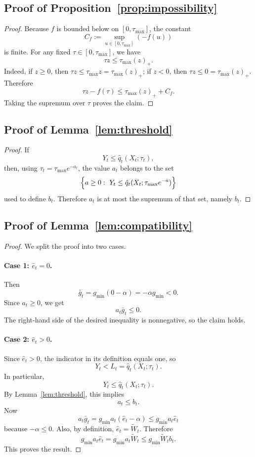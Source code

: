 \documentclass[11pt]{article}
\newcommand{\1}{\mathbf{1}}
\begin{document}
\subsection{Proof of Proposition~\ref{prop:impossibility}}
\label{app:proof-impossibility}

\begin{proof}
Because $f$ is bounded below on $[0,\tau_{\max}]$, the constant
\[
C_f:=\sup_{u\in[0,\tau_{\max}]}(-f(u))
\]
is finite. For any fixed \(\tau\in[0,\tau_{\max}]\), we have
\[
\tau z\le \tau_{\max}(z)_+.
\]
Indeed, if \(z\ge 0\), then \(\tau z\le \tau_{\max}z=\tau_{\max}(z)_+\); if \(z<0\), then \(\tau z\le 0=\tau_{\max}(z)_+\). Therefore
\[
\tau z-f(\tau)\le \tau_{\max}(z)_+ + C_f.
\]
Taking the supremum over \(\tau\) proves the claim.
\end{proof}

\subsection{Proof of Lemma~\ref{lem:threshold}}
\label{app:proof-threshold}

\begin{proof}
If
\[
Y_t\le \hat q_t(X_t;\tau_t),
\]
then, using \(\tau_t=\tau_{\max}e^{-a_t}\), the value \(a_t\) belongs to the set
\[
\Bigl\{
a\ge 0:\ Y_t\le \hat q_t(X_t;\tau_{\max}e^{-a})
\Bigr\}
\]
used to define \(b_t\). Therefore \(a_t\) is at most the supremum of that set, namely \(b_t\).
\end{proof}

\subsection{Proof of Lemma~\ref{lem:compatibility}}
\label{app:proof-compatibility}

\begin{proof}
We split the proof into two cases.

\paragraph{Case 1: \(\hat e_t=0\).}
Then
\[
\bar g_t=g_{\min}(0-\alpha)=-\alpha g_{\min}<0.
\]
Since \(a_t\ge 0\), we get
\[
a_t\bar g_t\le 0.
\]
The right-hand side of the desired inequality is nonnegative, so the claim holds.

\paragraph{Case 2: \(\hat e_t>0\).}
Since \(\hat e_t>0\), the indicator in its definition equals one, so
\[
Y_t< L_t=\hat q_t(X_t;\tau_t).
\]
In particular,
\[
Y_t\le \hat q_t(X_t;\tau_t).
\]
By Lemma~\ref{lem:threshold}, this implies
\[
a_t\le b_t.
\]
Now
\[
a_t\bar g_t
=
g_{\min}a_t(\hat e_t-\alpha)
\le
g_{\min}a_t\hat e_t
\]
because \(-\alpha\le 0\). Also, by definition, \(\hat e_t=\widetilde W_t\). Therefore
\[
g_{\min}a_t\hat e_t
=
g_{\min}a_t\widetilde W_t
\le
g_{\min}\widetilde W_t b_t.
\]
This proves the result.
\end{proof}
\end{document}
